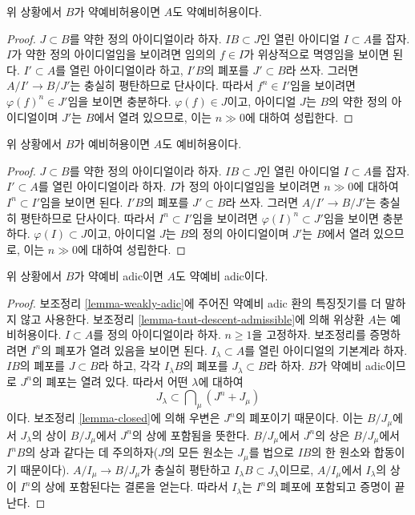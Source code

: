 \begin{lemma}
\label{lemma-taut-descent-weakly-admissible}
위 상황에서 $B$가 약예비허용이면 $A$도 약예비허용이다.
\end{lemma}

\begin{proof}
$J \subset B$를 약한 정의 아이디얼이라 하자. $IB \subset J$인
열린 아이디얼 $I \subset A$를 잡자. $I$가 약한 정의 아이디얼임을
보이려면 임의의 $f \in I$가 위상적으로 멱영임을 보이면 된다.
$I' \subset A$를 열린 아이디얼이라 하고, $I'B$의 폐포를
$J' \subset B$라 쓰자. 그러면 $A/I' \to B/J'$는 충실히 평탄하므로
단사이다. 따라서 $f^n \in I'$임을 보이려면
$\varphi(f)^n \in J'$임을 보이면 충분하다. $\varphi(f) \in J$이고,
아이디얼 $J$는 $B$의 약한 정의 아이디얼이며 $J'$는 $B$에서
열려 있으므로, 이는 $n \gg 0$에 대하여 성립한다.
\end{proof}

\begin{lemma}
\label{lemma-taut-descent-admissible}
위 상황에서 $B$가 예비허용이면 $A$도 예비허용이다.
\end{lemma}

\begin{proof}
$J \subset B$를 약한 정의 아이디얼이라 하자. $IB \subset J$인
열린 아이디얼 $I \subset A$를 잡자. $I' \subset A$를 열린
아이디얼이라 하자. $I$가 정의 아이디얼임을 보이려면 $n \gg 0$에
대하여 $I^n \subset I'$임을 보이면 된다. $I'B$의 폐포를
$J' \subset B$라 쓰자. 그러면 $A/I' \to B/J'$는 충실히 평탄하므로
단사이다. 따라서 $I^n \subset I'$임을 보이려면
$\varphi(I)^n \subset J'$임을 보이면 충분하다. $\varphi(I) \subset J$이고,
아이디얼 $J$는 $B$의 정의 아이디얼이며 $J'$는 $B$에서 열려
있으므로, 이는 $n \gg 0$에 대하여 성립한다.
\end{proof}

\begin{lemma}
\label{lemma-taut-descent-weakly-adic}
위 상황에서 $B$가 약예비 adic이면 $A$도 약예비 adic이다.
\end{lemma}

\begin{proof}
보조정리 \ref{lemma-weakly-adic}에 주어진 약예비 adic 환의 특징짓기를
더 말하지 않고 사용한다. 보조정리
\ref{lemma-taut-descent-admissible}에 의해 위상환 $A$는 예비허용이다.
$I \subset A$를 정의 아이디얼이라 하자. $n \geq 1$을 고정하자.
보조정리를 증명하려면 $I^n$의 폐포가 열려 있음을 보이면 된다.
$I_\lambda \subset A$를 열린 아이디얼의 기본계라 하자.
$IB$의 폐포를 $J \subset B$라 하고, 각각 $I_\lambda B$의 폐포를
$J_\lambda \subset B$라 하자. $B$가 약예비 adic이므로 $J^n$의
폐포는 열려 있다. 따라서 어떤 $\lambda$에 대하여
$$
J_\lambda \subset \bigcap\nolimits_\mu (J^n + J_\mu)
$$
이다. 보조정리 \ref{lemma-closed}에 의해 우변은 $J^n$의 폐포이기
때문이다. 이는 $B/J_\mu$에서 $J_\lambda$의 상이 $B/J_\mu$에서
$J^n$의 상에 포함됨을 뜻한다. $B/J_\mu$에서 $J^n$의 상은
$B/J_\mu$에서 $I^nB$의 상과 같다는 데 주의하자($J$의 모든 원소는
$J_\mu$를 법으로 $IB$의 한 원소와 합동이기 때문이다).
$A/I_\mu \to B/J_\mu$가 충실히 평탄하고
$I_\lambda B \subset J_\lambda$이므로, $A/I_\mu$에서
$I_\lambda$의 상이 $I^n$의 상에 포함된다는 결론을 얻는다.
따라서 $I_\lambda$는 $I^n$의 폐포에 포함되고 증명이 끝난다.
\end{proof}

